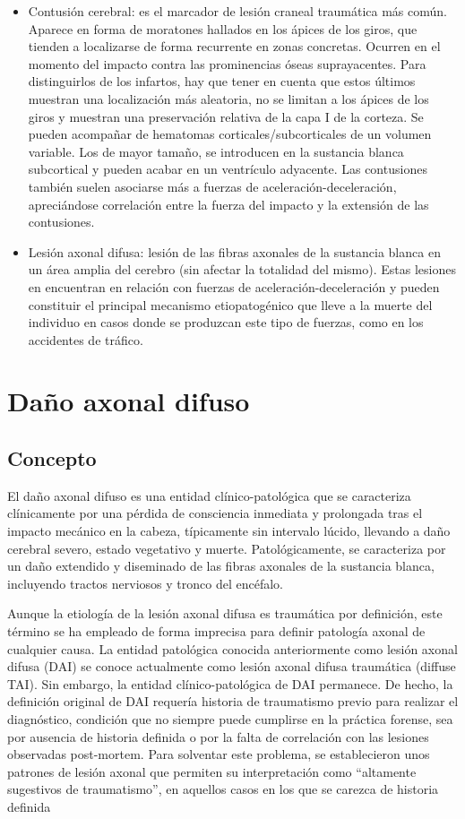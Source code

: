 \begin{itemize}
	\item Contusión cerebral: es el marcador de lesión craneal traumática más común. Aparece en forma de moratones hallados en los ápices de los giros, que tienden a localizarse de forma recurrente en zonas concretas. Ocurren en el momento del impacto contra las prominencias óseas suprayacentes. Para distinguirlos de los infartos, hay que tener en cuenta que estos últimos muestran una localización más aleatoria, no se limitan a los ápices de los giros y muestran una preservación relativa de la capa I de la corteza. Se pueden acompañar de hematomas corticales/subcorticales de un volumen variable. Los de mayor tamaño, se introducen en la sustancia blanca subcortical y pueden acabar en un ventrículo adyacente. Las contusiones también suelen asociarse más a fuerzas de aceleración-deceleración, apreciándose correlación entre la fuerza del impacto y la extensión de las contusiones. 
	\item Lesión axonal difusa: lesión de las fibras axonales de la sustancia blanca en un área amplia del cerebro (sin afectar la totalidad del mismo). Estas lesiones en encuentran en relación con fuerzas de aceleración-deceleración y pueden constituir el principal mecanismo etiopatogénico que lleve a la muerte del individuo en casos donde se produzcan este tipo de fuerzas, como en los accidentes de tráfico. 
\end{itemize}

\section{Daño axonal difuso}
\subsection{Concepto} \cite{Davceva2015} \cite{Gaetz2004} \cite{Johnson2013} \cite{Profyris2004} \cite{Stoica2010}
El daño axonal difuso es una entidad clínico-patológica que se caracteriza clínicamente por una pérdida de consciencia inmediata y prolongada tras el impacto mecánico en la cabeza, típicamente sin intervalo lúcido, llevando a daño cerebral severo, estado vegetativo y muerte. Patológicamente, se caracteriza por un daño extendido y diseminado de las fibras axonales de la sustancia blanca, incluyendo tractos nerviosos y tronco del encéfalo.

Aunque la etiología de la lesión axonal difusa es traumática por definición, este término se ha empleado de forma imprecisa para definir patología axonal de cualquier causa. La entidad patológica conocida anteriormente como lesión axonal difusa (DAI) se conoce actualmente como lesión axonal difusa traumática (diffuse TAI). Sin embargo, la entidad clínico-patológica de DAI permanece. De hecho, la definición original de DAI requería historia de traumatismo previo para realizar el diagnóstico, condición que no siempre puede cumplirse en la práctica forense, sea por ausencia de historia definida o por la falta de correlación con las lesiones observadas post-mortem. Para solventar este problema, se establecieron unos patrones de lesión axonal que permiten su interpretación como “altamente sugestivos de traumatismo”, en aquellos casos en los que se carezca de historia definida \cite{Reichard2005}

